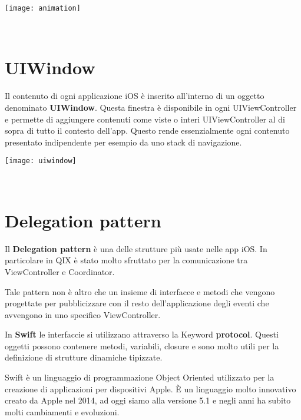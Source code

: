 \begin{minipage}{\linewidth}
    \centering
    \texttt{[image: animation]}
    \label{fig:6}
\end{minipage}\\

\section{UIWindow}\label{sec:uiwindow}

Il contenuto di ogni applicazione iOS è inserito all'interno di un oggetto denominato
\textbf{UIWindow}\cite{uiwindow}. Questa finestra è disponibile in ogni UIViewController e permette di aggiungere contenuti
come viste o interi UIViewController al di sopra di tutto il contesto dell'app. Questo rende essenzialmente ogni contenuto presentato
indipendente per esempio da uno stack di navigazione.

\begin{minipage}{\linewidth}
    \centering
    \texttt{[image: uiwindow]}
    \label{fig:7}
\end{minipage}\\


\section{Delegation pattern}\label{delegation}

Il \textbf{Delegation pattern} è una delle strutture più usate nelle app iOS. In particolare in QIX
è stato molto sfruttato per la comunicazione tra ViewController e Coordinator.

Tale pattern non è altro che un insieme di interfacce e metodi che
vengono progettate per pubblicizzare con il resto dell'applicazione degli eventi che avvengono in uno specifico ViewController.

In \textbf{Swift} le interfaccie si utilizzano attraverso la Keyword \textbf{protocol}. Questi oggetti possono contenere metodi, variabili, closure
e sono molto utili per la definizione di strutture dinamiche tipizzate.

Swift è un linguaggio di programmazione Object Oriented utilizzato per la creazione di applicazioni per dispositivi Apple. È un
linguaggio molto innovativo creato da Apple nel 2014, ad oggi siamo alla versione 5.1 e negli anni ha subito molti cambiamenti e evoluzioni.

